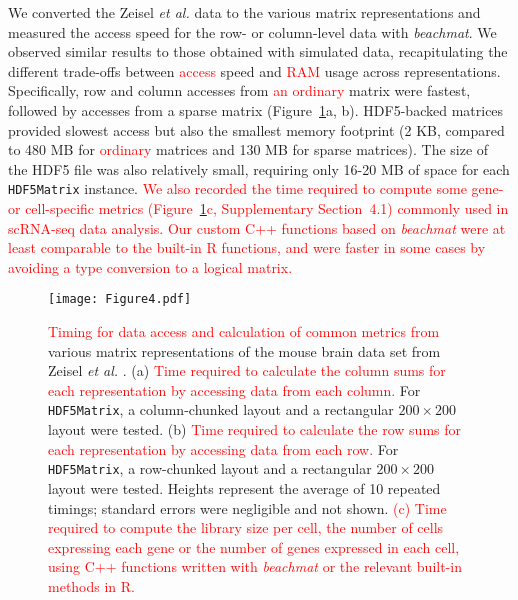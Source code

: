 \documentclass[10pt,letterpaper]{article}
\newcommand{\suppsecrealzeisel}{4.1}
\newcommand{\beachmat}{\textit{beachmat}}
\newcommand{\code}[1]{\texttt{#1}}
\newcommand{\revised}[1]{\textcolor{red}{#1}}
\begin{document}
We converted the Zeisel \textit{et al.} data to the various matrix representations and measured the access speed for the row- or column-level data with \beachmat{}.
We observed similar results to those obtained with simulated data, recapitulating the different trade-offs between \revised{access} speed and \revised{RAM} usage across representations.
Specifically, row and column accesses from \revised{an ordinary} matrix were fastest, followed by accesses from a sparse matrix (Figure~\ref{fig:zeisel}a, b).
HDF5-backed matrices provided slowest access but also the smallest memory footprint (2 KB, compared to 480 MB for \revised{ordinary} matrices and 130 MB for sparse matrices).
The size of the HDF5 file was also relatively small, requiring only 16-20 MB of space for each \code{HDF5Matrix} instance.
\revised{We also recorded the time required to compute some gene- or cell-specific metrics (Figure~\ref{fig:zeisel}c, Supplementary Section~\suppsecrealzeisel{}) commonly used in scRNA-seq data analysis.
Our custom C++ functions based on \beachmat{} were at least comparable to the built-in R functions, and were faster in some cases by avoiding a type conversion to a logical matrix.}

\begin{figure}[btp]
    \begin{center}
        \texttt{[image: Figure4.pdf]}
    \end{center}
    \caption{\revised{Timing for data access and calculation of common metrics from} various matrix representations of the mouse brain data set from Zeisel \textit{et al.} \cite{zeisel2015brain}.
(a) \revised{Time required to calculate the column sums for each representation by accessing data from each column.}
For \code{HDF5Matrix}, a column-chunked layout and a rectangular $200 \times 200$ layout were tested.
(b) \revised{Time required to calculate the row sums for each representation by accessing data from each row.}
For \code{HDF5Matrix}, a row-chunked layout and a rectangular $200 \times 200$ layout were tested.
Heights represent the average of 10 repeated timings; standard errors were negligible and not shown.
\revised{(c) Time required to compute the library size per cell, the number of cells expressing each gene or the number of genes expressed in each cell, using C++ functions written with \beachmat{} or the relevant built-in methods in R.}}
    \label{fig:zeisel}
\end{figure}
\end{document}
